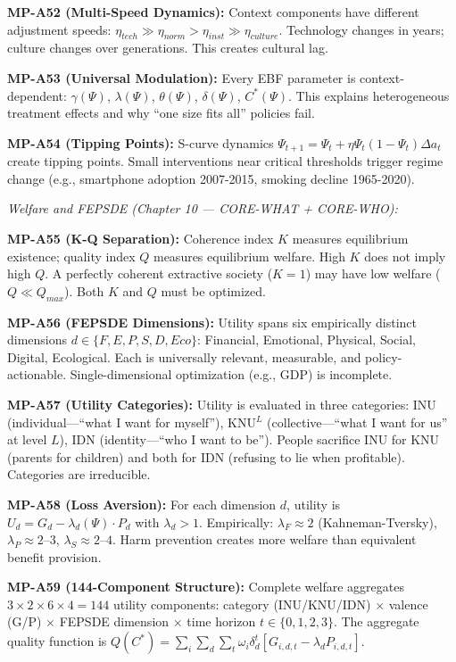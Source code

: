 \begin{tcolorbox}[colback=gray!5!white, colframe=gray!75!black,
    title=\textbf{MP Axioms}]
\textbf{MP-A52 (Multi-Speed Dynamics):} Context components have different adjustment speeds: $\eta_{tech} \gg \eta_{norm} > \eta_{inst} \gg \eta_{culture}$. Technology changes in years; culture changes over generations. This creates cultural lag.

\textbf{MP-A53 (Universal Modulation):} Every EBF parameter is context-dependent: $\gamma(\Psi)$, $\lambda(\Psi)$, $\theta(\Psi)$, $\delta(\Psi)$, $C^*(\Psi)$. This explains heterogeneous treatment effects and why ``one size fits all'' policies fail.

\textbf{MP-A54 (Tipping Points):} S-curve dynamics $\Psi_{t+1} = \Psi_t + \eta\Psi_t(1-\Psi_t)\Delta a_t$ create tipping points. Small interventions near critical thresholds trigger regime change (e.g., smartphone adoption 2007-2015, smoking decline 1965-2020).

\medskip
\textit{Welfare and FEPSDE (Chapter 10 --- CORE-WHAT + CORE-WHO):}

\textbf{MP-A55 (K-Q Separation):} Coherence index $K$ measures equilibrium existence; quality index $Q$ measures equilibrium welfare. High $K$ does not imply high $Q$. A perfectly coherent extractive society ($K = 1$) may have low welfare ($Q \ll Q_{max}$). Both $K$ and $Q$ must be optimized.

\textbf{MP-A56 (FEPSDE Dimensions):} Utility spans six empirically distinct dimensions $d \in \{F, E, P, S, D, Eco\}$: Financial, Emotional, Physical, Social, Digital, Ecological. Each is universally relevant, measurable, and policy-actionable. Single-dimensional optimization (e.g., GDP) is incomplete.

\textbf{MP-A57 (Utility Categories):} Utility is evaluated in three categories: INU (individual---``what I want for myself''), KNU$^L$ (collective---``what I want for us'' at level $L$), IDN (identity---``who I want to be''). People sacrifice INU for KNU (parents for children) and both for IDN (refusing to lie when profitable). Categories are irreducible.

\textbf{MP-A58 (Loss Aversion):} For each dimension $d$, utility is $U_d = G_d - \lambda_d(\Psi) \cdot P_d$ with $\lambda_d > 1$. Empirically: $\lambda_F \approx 2$ (Kahneman-Tversky), $\lambda_P \approx 2$--$3$, $\lambda_S \approx 2$--$4$. Harm prevention creates more welfare than equivalent benefit provision.

\textbf{MP-A59 (144-Component Structure):} Complete welfare aggregates $3 \times 2 \times 6 \times 4 = 144$ utility components: category (INU/KNU/IDN) $\times$ valence (G/P) $\times$ FEPSDE dimension $\times$ time horizon $t \in \{0,1,2,3\}$. The aggregate quality function is $Q(C^*) = \sum_i \sum_d \sum_t \omega_i \delta_d^t [G_{i,d,t} - \lambda_d P_{i,d,t}]$.


\end{tcolorbox}
